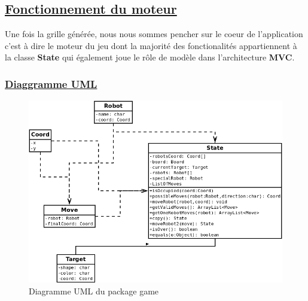 \documentclass[12pt]{article}
\begin{document}
	\newpage
	\subsection{\underline{Fonctionnement du moteur}}
	Une fois la grille générée, nous nous sommes pencher sur le coeur de l'application c'est à dire le moteur du jeu dont la majorité
	des fonctionalités appartiennent à la classe \textbf{State} qui également joue le rôle de modèle dans l'architecture \textbf{MVC}.
	\subsubsection{\underline{Diaggramme UML}}
	\begin{figure}[h!]
		\begin{center}
			\includegraphics[width=1\textwidth]{Images/model.png}
		\end{center}
		\caption{Diagramme UML du package game}
		\label{gameuml}
	\end{figure}
\end{document}
